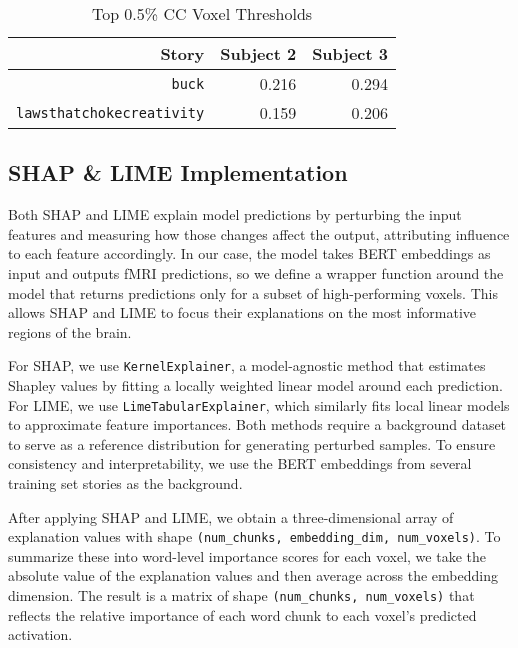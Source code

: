 \documentclass[10pt,letterpaper]{article}
\begin{document}
\begin{table}[ht]
    \centering
    \caption{Top 0.5\% CC Voxel Thresholds}
    \begin{tabular}{r|r|r}
        \toprule
        \textbf{Story}                   &  \textbf{Subject 2} & \textbf{Subject 3}\\
        \midrule
        \texttt{buck}                    &  0.216              & 0.294\\
        \hline
        \texttt{lawsthatchokecreativity} &  0.159              & 0.206\\
        \bottomrule
    \end{tabular}
    \label{tab:voxel_select}
\end{table}

\subsection{SHAP \& LIME Implementation}

Both SHAP and LIME explain model predictions by perturbing the input features and measuring how those changes affect the output, attributing influence to each feature accordingly. In our case, the model takes BERT embeddings as input and outputs fMRI predictions, so we define a wrapper function around the model that returns predictions only for a subset of high-performing voxels. This allows SHAP and LIME to focus their explanations on the most informative regions of the brain.

For SHAP, we use \texttt{KernelExplainer}, a model-agnostic method that estimates Shapley values by fitting a locally weighted linear model around each prediction. For LIME, we use \texttt{LimeTabularExplainer}, which similarly fits local linear models to approximate feature importances. Both methods require a background dataset to serve as a reference distribution for generating perturbed samples. To ensure consistency and interpretability, we use the BERT embeddings from several training set stories as the background.

After applying SHAP and LIME, we obtain a three-dimensional array of explanation values with shape \texttt{(num\_chunks, embedding\_dim, num\_voxels)}. To summarize these into word-level importance scores for each voxel, we take the absolute value of the explanation values and then average across the embedding dimension. The result is a matrix of shape \texttt{(num\_chunks, num\_voxels)} that reflects the relative importance of each word chunk to each voxel’s predicted activation.
\end{document}
